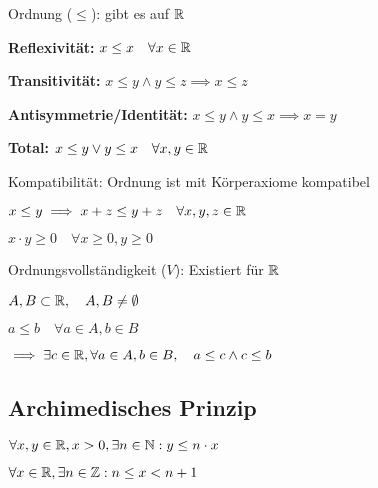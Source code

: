 \begin{compactdesc}
\begin{compactenum}[{D}.1]
        \end{compactenum}
    \item[Ordnung ($\le $):] gibt es auf $\mathbb{R}$
        \begin{compactenum}[{O}.1]
        \item \textbf{Reflexivität:} $x \le x \quad \forall x \in \mathbb{R}$
        \item \textbf{Transitivität:} $x \le y \wedge y \le z \implies x \le z$
        \item \textbf{Antisymmetrie/Identität:} $x \le y \wedge y \le x \implies x = y$
        \item \textbf{Total:} $x \le y \vee y \le x \quad \forall x,y \in \mathbb{R}$
        \end{compactenum}
    \item[Kompatibilität:] Ordnung ist mit Körperaxiome kompatibel
        \begin{compactenum}[{K}.1]
            \item $x \le y \implies x + z \le y + z \quad \forall x,y,z \in \mathbb{R}$
            \item $x \cdot  y \ge 0 \quad \forall x \ge 0, y \ge 0$
        \end{compactenum}
    \item[Ordnungsvollständigkeit ($V$):] Existiert für $\mathbb{R}$
        \begin{compactenum}
            \item $A, B \subset \mathbb{R}, \quad A, B \neq \emptyset$
            \item $a \le  b \quad \forall  a \in  A,b \in B$
        \end{compactenum}
        $\implies \exists c \in  \mathbb{R}, \forall a \in  A, b \in  B, \quad a \le c \wedge c \le b$
\end{compactdesc}

\subsection{Archimedisches Prinzip}
\begin{compactenum} \item $\forall x,y \in \mathbb{R}, x > 0, \exists n \in \mathbb{N}: y \le n \cdot x$ 
    \item $\forall x \in \mathbb{R}, \exists n \in \mathbb{Z}: n \le x < n + 1$
\end{compactenum}

